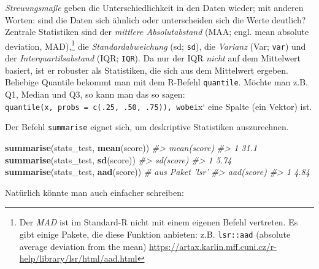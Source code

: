 \documentclass[12pt,ngerman,]{book}
\makeatletter
\newenvironment{Shaded}{\begin{snugshade}}{\end{snugshade}}
\newcommand{\KeywordTok}[1]{\textcolor[rgb]{0.13,0.29,0.53}{\textbf{#1}}}
\newcommand{\CommentTok}[1]{\textcolor[rgb]{0.56,0.35,0.01}{\textit{#1}}}
\newcommand{\OperatorTok}[1]{\textcolor[rgb]{0.81,0.36,0.00}{\textbf{#1}}}
\newcommand{\NormalTok}[1]{#1}
\let\rmarkdownfootnote\footnote%
\def\footnote{\protect\rmarkdownfootnote}
\newenvironment{kframe}{%
\medskip{}
\setlength{\fboxsep}{.8em}
 \def\at@end@of@kframe{}%
 \ifinner\ifhmode%
  \def\at@end@of@kframe{\end{minipage}}%
  \begin{minipage}{\columnwidth}%
 \fi\fi%
 \def\FrameCommand##1{\hskip\@totalleftmargin \hskip-\fboxsep
 \colorbox{shadecolor}{##1}\hskip-\fboxsep
     \hskip-\linewidth \hskip-\@totalleftmargin \hskip\columnwidth}%
 \MakeFramed {\advance\hsize-\width
   \@totalleftmargin\z@ \linewidth\hsize
   \@setminipage}}%
 {\par\unskip\endMakeFramed%
 \at@end@of@kframe}
\renewenvironment{Shaded}{\begin{kframe}}{\end{kframe}}
\theoremstyle{definition}
\theoremstyle{definition}
\theoremstyle{remark}
\makeatother
\begin{document}
\emph{Streuungsmaße} geben die Unterschiedlichkeit
in den Daten wieder; mit anderen Worten: sind die Daten sich ähnlich
oder unterscheiden sich die Werte deutlich? Zentrale Statistiken sind
der \emph{mittlere Absolutabstand} (MAA; engl. mean absolute deviation,
MAD),\footnote{Der \emph{MAD} ist im Standard-R nicht mit einem eigenen
  Befehl vertreten. Es gibt einige Pakete, die diese Funktion anbieten:
  z.B. \texttt{lsr::aad} (absolute average deviation from the mean)
  \url{https://artax.karlin.mff.cuni.cz/r-help/library/lsr/html/aad.html}}
die \emph{Standardabweichung} (sd; \texttt{sd}), die \emph{Varianz}
(Var; \texttt{var}) und der \emph{Interquartilsabstand} (IQR;
\texttt{IQR}). Da nur der IQR \emph{nicht} auf dem Mittelwert basiert,
ist er robuster als Statistiken, die sich aus dem Mittelwert ergeben.
Beliebige Quantile bekommt man mit dem R-Befehl \texttt{quantile}.
Möchte man z.B. Q1, Median und Q3, so kann man das so sagen:
\texttt{quantile(x,\ probs\ =\ c(.25,\ .50,\ .75)),\ wobei}x` eine
Spalte (ein Vektor) ist.

Der Befehl \texttt{summarise} eignet sich, um deskriptive Statistiken
auszurechnen.

\begin{Shaded}
\begin{Highlighting}[]
\KeywordTok{summarise}\NormalTok{(stats_test, }\KeywordTok{mean}\NormalTok{(score))}
\CommentTok{#>   mean(score)}
\CommentTok{#> 1        31.1}
\KeywordTok{summarise}\NormalTok{(stats_test, }\KeywordTok{sd}\NormalTok{(score))}
\CommentTok{#>   sd(score)}
\CommentTok{#> 1      5.74}
\KeywordTok{summarise}\NormalTok{(stats_test, }\KeywordTok{aad}\NormalTok{(score))  }\CommentTok{# aus Paket 'lsr'}
\CommentTok{#>   aad(score)}
\CommentTok{#> 1       4.84}
\end{Highlighting}
\end{Shaded}

Natürlich könnte man auch einfacher schreiben:

\begin{Shaded}
\end{Shaded}
\end{document}

